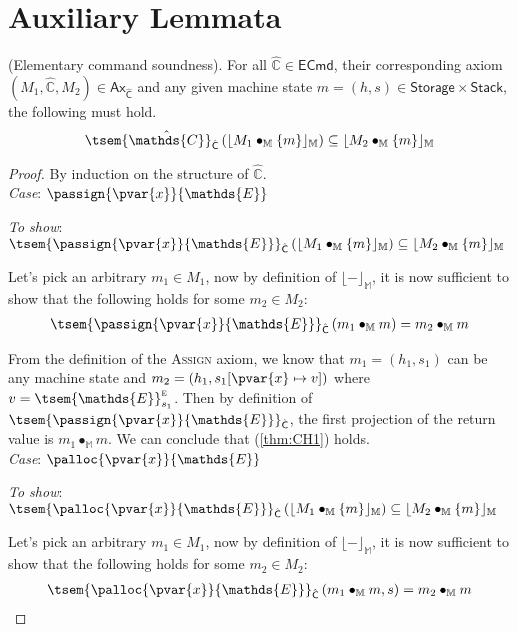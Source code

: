 \section{Auxiliary Lemmata}

\thm \label{thm:eSound} (Elementary command soundness). For all $\hat{\mathds{C}} \in \mathsf{ECmd}$, their corresponding axiom $(M_1, \hat{\mathds{C}}, M_2) \in \mathsf{Ax}_{\hat{\mathsf{C}}}$ and any given machine state $m = (h, s) \in \mathsf{Storage} \times \mathsf{Stack}$, the following must hold.
\[
	\tsem{\hat{\mathds{C}}}_{\hat{\mathsf{C}}} \left( \lfloor M_1 \bullet_\mathbb{M} \{m\} \rfloor_\mathbb{M} \right) \subseteq \lfloor M_2 \bullet_\mathbb{M} \{m\} \rfloor_\mathbb{M}
\]
{\parindent0pt
\begin{proof}
By induction on the structure of $\hat{\mathds{C}}$. \\

\textit{Case}: $\passign{\pvar{x}}{\mathds{E}}$

\textit{To show}: $\tsem{\passign{\pvar{x}}{\mathds{E}}}_{\hat{\mathsf{C}}} \left( \lfloor M_1 \bullet_\mathbb{M} \{m\} \rfloor_\mathbb{M} \right) \subseteq \lfloor M_2 \bullet_\mathbb{M} \{m\} \rfloor_\mathbb{M}$

Let's pick an arbitrary $m_1 \in M_1$, now by definition of $\lfloor - \rfloor_\mathbb{M}$, it is now sufficient to show that the following holds for some $m_2 \in M_2$:
\begin{gather}
	\label{thm:CH1} \tsem{\passign{\pvar{x}}{\mathds{E}}}_{\hat{\mathsf{C}}} \left(m_1 \bullet_\mathbb{M} m \right) = m_2 \bullet_\mathbb{M} m
\end{gather}

From the definition of the \textsc{Assign} axiom, we know that $m_1 = (h_1, s_1)$ can be any machine state and $m_2 = (h_1, s_1[\pvar{x} \mapsto v])$ where $v = \tsem{\mathds{E}}^\textsc{e}_{s_1}$. Then by definition of $\tsem{\passign{\pvar{x}}{\mathds{E}}}_{\hat{\mathsf{C}}}$, the first projection of the return value is $m_1 \bullet_\mathbb{M} m$. We can conclude that (\ref{thm:CH1}) holds.  \\

\textit{Case}: $\palloc{\pvar{x}}{\mathds{E}}$

\textit{To show}: $\tsem{\palloc{\pvar{x}}{\mathds{E}}}_{\hat{\mathsf{C}}} \left( \lfloor M_1 \bullet_\mathbb{M} \{m\} \rfloor_\mathbb{M} \right) \subseteq \lfloor M_2 \bullet_\mathbb{M} \{m\} \rfloor_\mathbb{M}$

Let's pick an arbitrary $m_1 \in M_1$, now by definition of $\lfloor - \rfloor_\mathbb{M}$, it is now sufficient to show that the following holds for some $m_2 \in M_2$:
\begin{gather}
	\label{thm:CH3} \tsem{\palloc{\pvar{x}}{\mathds{E}}}_{\hat{\mathsf{C}}} \left(m_1 \bullet_\mathbb{M} m, s \right) = m_2 \bullet_\mathbb{M} m
\end{gather}


\end{proof}}
